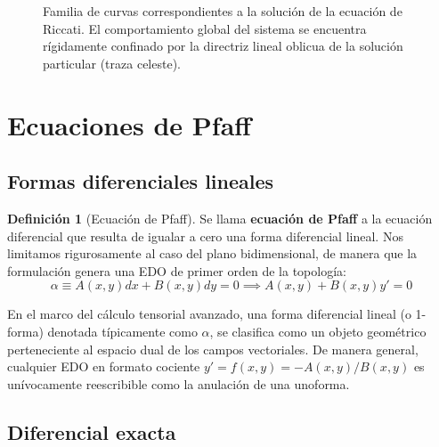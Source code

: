 \documentclass[11pt,a4paper]{article}
\theoremstyle{definition}
\newtheorem{definition}{Definición}[section]
\theoremstyle{plain}
\begin{document}
\begin{tcolorbox}
\begin{figure}[H]
    \caption{Familia de curvas correspondientes a la solución de la ecuación de Riccati. El comportamiento global del sistema se encuentra rígidamente confinado por la directriz lineal oblicua de la solución particular (traza celeste).}
\end{figure}
\end{tcolorbox}
\newpage

\section{Ecuaciones de Pfaff}

\subsection{Formas diferenciales lineales}

\begin{definition}[Ecuación de Pfaff]
Se llama \textbf{ecuación de Pfaff} a la ecuación diferencial que resulta de igualar a cero una forma diferencial lineal. Nos limitamos rigurosamente al caso del plano bidimensional, de manera que la formulación genera una EDO de primer orden de la topología:
$$ \alpha \equiv A(x,y)dx + B(x,y)dy = 0 \implies A(x,y) + B(x,y)y' = 0 $$
\end{definition}

En el marco del cálculo tensorial avanzado, una forma diferencial lineal (o 1-forma) denotada típicamente como $\alpha$, se clasifica como un objeto geométrico perteneciente al espacio dual de los campos vectoriales. De manera general, cualquier EDO en formato cociente $y' = f(x,y) = -A(x,y)/B(x,y)$ es unívocamente reescribible como la anulación de una unoforma.

\subsection{Diferencial exacta}
\end{document}
